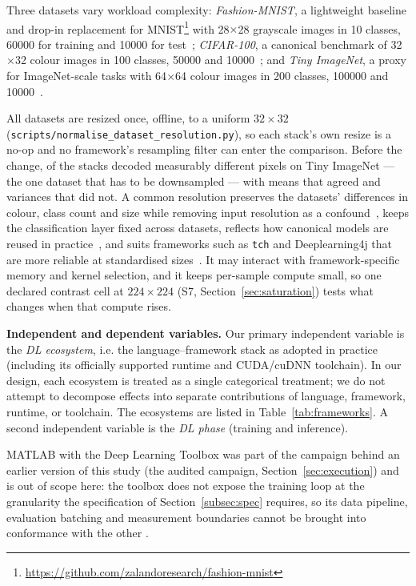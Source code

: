 Three datasets vary workload complexity: \emph{Fashion-MNIST}, a lightweight
baseline and drop-in replacement for MNIST\footnote{\url{https://github.com/zalandoresearch/fashion-mnist}}
with 28$\times$28 grayscale images in 10 classes, \num{60000} for training and \num{10000}
for test~\citep{xiao2017fashion}; \emph{CIFAR-100}, a canonical benchmark of
32$\times$32 colour images in 100 classes, \num{50000} and
\num{10000}~\citep{krizhevsky2009learning}; and \emph{Tiny ImageNet}, a proxy for
ImageNet-scale tasks with 64$\times$64 colour images in 200 classes, \num{100000} and
\num{10000}~\citep{le2015tinyimagenet}.

All datasets are resized once, offline, to a uniform $32\times32$
(\texttt{scripts/normalise\_dataset\_resolution.py}), so each stack's own resize
is a no-op and no framework's resampling filter can enter the comparison. Before
the change, \vPixelDivergentStacks{} of the \vEcosystems{} stacks decoded
measurably different pixels on Tiny ImageNet --- the one dataset that has to be
downsampled --- with means that agreed and variances that did not. A common
resolution preserves the datasets' differences in colour, class count and size
while removing input resolution as a confound~\citep{marini2025green,georgiou2022green},
keeps the classification layer fixed across datasets, reflects how canonical
models are reused in practice~\citep{cruz2025greening,verdecchia2023systematic},
and suits frameworks such as \texttt{tch} and Deeplearning4j that are more
reliable at standardised sizes~\citep{pereira2021ranking,gordillo2024ranking}.
It may interact with framework-specific memory and kernel selection, and it
keeps per-sample compute small, so one declared contrast cell at
$224\times224$ (S7, Section~\ref{sec:saturation}) tests what changes when that
compute rises.

\textbf{Independent and dependent variables.}
Our primary independent variable is the \emph{DL ecosystem}, i.e. the language--framework stack as adopted in practice (including its officially supported runtime and CUDA/cuDNN toolchain). In our design, each ecosystem is treated as a single categorical treatment; we do not attempt to decompose effects into separate contributions of language, framework, runtime, or toolchain.
The \vEcosystems{} ecosystems are listed in Table~\ref{tab:frameworks}. A second independent variable is the \emph{DL phase} (training and inference).

MATLAB with the Deep Learning Toolbox was part of the campaign behind an earlier
version of this study (the audited campaign, Section~\ref{sec:execution})
and is out of scope here: the toolbox does not expose the training loop at the
granularity the specification of Section~\ref{subsec:spec} requires, so its data
pipeline, evaluation batching and measurement boundaries cannot be brought into
conformance with the other \vEcosystems{}.

